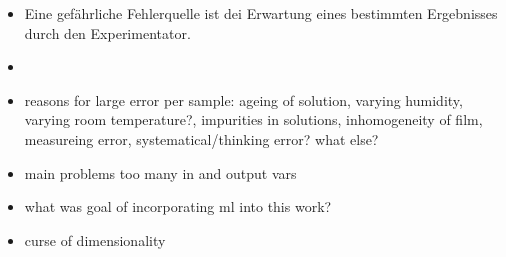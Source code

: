 \begin{itemize}
    \item Eine gefährliche Fehlerquelle ist dei Erwartung eines bestimmten Ergebnisses durch den Experimentator. \cite{haertler2014statistisch}
    \item {} 
    \item reasons for large error per sample: ageing of solution, varying humidity, varying room temperature?, impurities in solutions, inhomogeneity of film, measureing error, systematical/thinking error? what else? 
    \item main problems too many in and output vars
    \item what was goal of incorporating ml into this work? 
    \item curse of dimensionality

\end{itemize}
